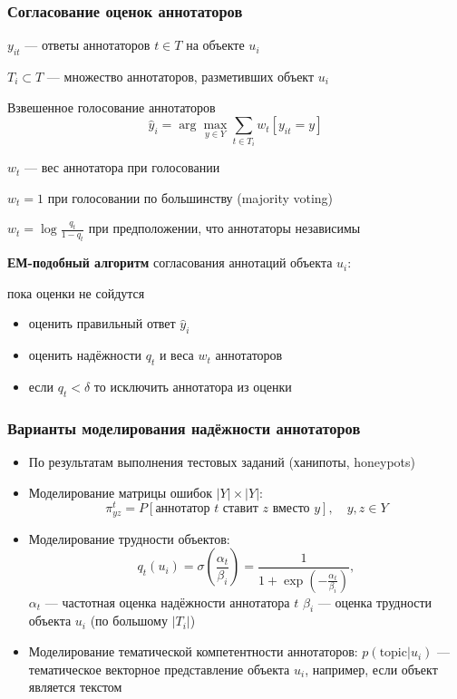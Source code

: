 \documentclass[fullscreen=true, bookmarks=true, hyperref={pdfencoding=unicode}]{beamer}
\begin{document}
\begin{frame}
  \frametitle{Согласование оценок аннотаторов}

  $y_{it}$ — ответы аннотаторов $t \in T$ на объекте $u_i$

  $T_i \subset T$ — множество аннотаторов, разметивших объект $u_i$

  \begin{block}{Взвешенное голосование аннотаторов}
    $$ \hat y_i = \arg \max\limits_{y\in Y}
    \sum\limits_{t \in T_i} w_t [y_{it} = y]$$

    $w_t$ — вес аннотатора при голосовании

    $w_t = 1$ при голосовании по большинству (majority voting)

    $w_t = \log \frac{q_t}{1-q_t}$ при предположении, что аннотаторы независимы
  \end{block}

  {\bf ЕМ-подобный алгоритм} согласования аннотаций объекта $u_i$:

  {\color{brown} пока} оценки не сойдутся
  \begin{itemize}
    \item оценить правильный ответ $\hat y_i$
    \item оценить надёжности $q_t$ и веса $w_t$ аннотаторов
    \item если $q_t < \delta$ то исключить аннотатора из оценки
  \end{itemize}

\end{frame}


\begin{frame}
  \frametitle{Варианты моделирования надёжности аннотаторов}

  \begin{itemize}
    \item По результатам выполнения тестовых заданий (ханипоты, honeypots)
    \item Моделирование матрицы ошибок $|Y|\times|Y|$:
    $$ \pi_{yz}^t = P[\text{аннотатор } t \text{ ставит } z \text{ вместо }y], \quad y, z \in Y$$
    \item Моделирование трудности объектов:
    $$ q_t(u_i) = \sigma \left(\frac{\alpha_t}{\beta_i} \right) = \frac{1}{1 + \exp\left(-\frac{\alpha_t}{\beta_i} \right) },$$
    $\alpha_t$ — частотная оценка надёжности аннотатора $t$
    $\beta_i$ — оценка трудности объекта $u_i$ (по большому $|T_i|$)
    \item Моделирование тематической компетентности аннотаторов:
      $p(\text{topic}|u_i)$ — тематическое векторное представление
      объекта $u_i$, например, если объект является текстом
  \end{itemize}

\end{frame}
\end{document}
